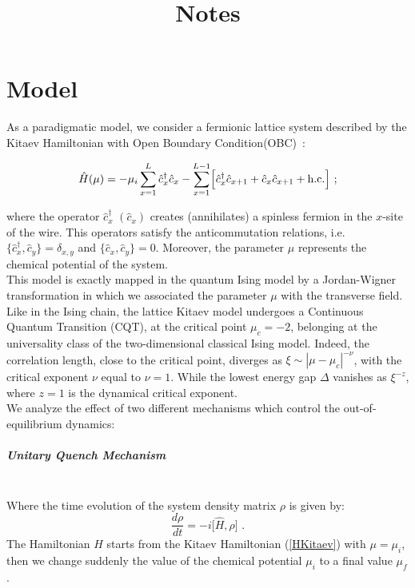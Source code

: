 \documentclass[pra,twocolumn,preprintnumbers,amsmath,amssymb,nofootinbib,floatfix,longbibliography]{revtex4}
\begin{document}
\title{Notes}

\author{}
\affiliation{}


\begin{abstract}
\end{abstract}
\maketitle

\section{Model}

As a paradigmatic model, we consider a fermionic lattice
system described by the Kitaev Hamiltonian with Open
Boundary Condition(OBC)~\cite{K01}:

\begin{equation}
	\label{HKitaev}
	\hat H(\mu)=-\mu_i \sum_{x=1}^L\hat c_x^\dagger\hat c_x
    -\sum_{x=1}^{L-1} \Bigr[\hat c_x^\dagger \hat c_{x+1} +
	\hat c_x \hat c_{x+1} + {\rm h.c.} \Bigr]  \,\,;
\end{equation}

where the operator $\hat c_x^\dagger$ $(\hat c_x)$ creates
(annihilates) a spinless fermion in the $x$-site of the
wire. This operators satisfy the anticommutation relations,
i.e. $\{\hat c_x^\dagger, \hat c_y\} = \delta_{x,y}$ and
$\{\hat c_x, \hat c_y\} = 0$. Moreover, the parameter $\mu$
represents the chemical potential of the system.\\
This model is exactly mapped in the quantum Ising model by
a Jordan-Wigner transformation in which we associated the
parameter $\mu$ with the transverse field.\\
Like in the Ising chain, the lattice Kitaev model undergoes
a Continuous Quantum Transition (CQT), at the critical
point $\mu_c = -2$, belonging at the universality class of
the two-dimensional classical Ising model. Indeed, the
correlation length, close to the critical point, diverges
as $\xi \sim |\mu - \mu_c|^{-\nu}$, with the critical
exponent $\nu$ equal to $\nu = 1$. While the lowest energy
gap $\Delta$ vanishes as $\xi ^{-z}$, where $z=1$ is the
dynamical critical exponent.\\
We analyze the effect of two different mechanisms which
control the out-of-equilibrium dynamics:

\subparagraph{Unitary Quench Mechanism}$ $\\
  Where the time evolution of the system density matrix
  $\rho$ is given by:
  \begin{equation}
    \label{unitrhot}
    \frac{d \rho}{d t} = -i
    \bigr[ \hat H, \rho \bigr] \,\,.
  \end{equation}
  The Hamiltonian $H$ starts from the Kitaev Hamiltonian
  (\ref{HKitaev}) with $\mu = \mu_i$, then we change
  suddenly the value of the chemical potential $\mu_i$
  to a final value $\mu_f$.
\end{document}
